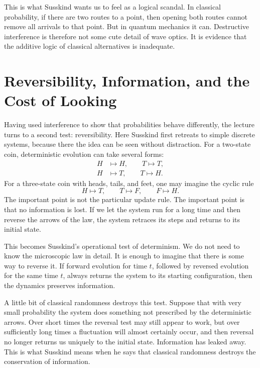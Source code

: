 This is what Susskind wants us to feel as a logical scandal. In classical probability, if there are two routes to a point, then opening both routes cannot remove all arrivals to that point. But in quantum mechanics it can. Destructive interference is therefore not some cute detail of wave optics. It is evidence that the additive logic of classical alternatives is inadequate.

\section{Reversibility, Information, and the Cost of Looking}

Having used interference to show that probabilities behave differently, the lecture turns to a second test: reversibility. Here Susskind first retreats to simple discrete systems, because there the idea can be seen without distraction. For a two-state coin, deterministic evolution can take several forms:
\begin{align}
H &\mapsto H, \qquad T \mapsto T,\\
H &\mapsto T, \qquad T \mapsto H.
\end{align}
For a three-state coin with heads, tails, and feet, one may imagine the cyclic rule
\begin{equation}
H \mapsto T,\qquad T \mapsto F,\qquad F \mapsto H.
\end{equation}
The important point is not the particular update rule. The important point is that no information is lost. If we let the system run for a long time and then reverse the arrows of the law, the system retraces its steps and returns to its initial state.

This becomes Susskind's operational test of determinism. We do not need to know the microscopic law in detail. It is enough to imagine that there is some way to reverse it. If forward evolution for time \(t\), followed by reversed evolution for the same time \(t\), always returns the system to its starting configuration, then the dynamics preserves information.

A little bit of classical randomness destroys this test. Suppose that with very small probability the system does something not prescribed by the deterministic arrows. Over short times the reversal test may still appear to work, but over sufficiently long times a fluctuation will almost certainly occur, and then reversal no longer returns us uniquely to the initial state. Information has leaked away. This is what Susskind means when he says that classical randomness destroys the conservation of information.

